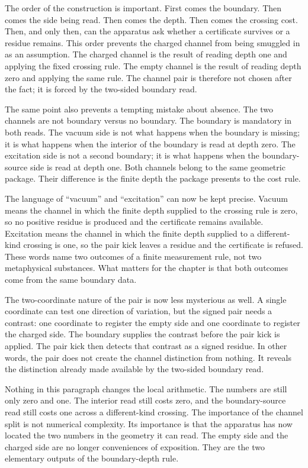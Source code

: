 The order of the construction is important. First comes the boundary. Then comes the
side being read. Then comes the depth. Then comes the crossing cost. Then, and only
then, can the apparatus ask whether a certificate survives or a residue remains. This
order prevents the charged channel from being smuggled in as an assumption. The
charged channel is the result of reading depth one and applying the fixed crossing
rule. The empty channel is the result of reading depth zero and applying the same
rule. The channel pair is therefore not chosen after the fact; it is forced by the
two-sided boundary read.

The same point also prevents a tempting mistake about absence. The two channels are
not boundary versus no boundary. The boundary is mandatory in both reads. The vacuum
side is not what happens when the boundary is missing; it is what happens when the
interior of the boundary is read at depth zero. The excitation side is not a second
boundary; it is what happens when the boundary-source side is read at depth one. Both
channels belong to the same geometric package. Their difference is the finite depth
the package presents to the cost rule.

The language of ``vacuum'' and ``excitation'' can now be kept precise. Vacuum means
the channel in which the finite depth supplied to the crossing rule is zero, so no
positive residue is produced and the certificate remains available. Excitation means
the channel in which the finite depth supplied to a different-kind crossing is one,
so the pair kick leaves a residue and the certificate is refused. These words name
two outcomes of a finite measurement rule, not two metaphysical substances. What
matters for the chapter is that both outcomes come from the same boundary data.

The two-coordinate nature of the pair is now less mysterious as well. A single
coordinate can test one direction of variation, but the signed pair needs a contrast:
one coordinate to register the empty side and one coordinate to register the charged
side. The boundary supplies the contrast before the pair kick is applied. The pair
kick then detects that contrast as a signed residue. In other words, the pair does
not create the channel distinction from nothing. It reveals the distinction already
made available by the two-sided boundary read.

Nothing in this paragraph changes the local arithmetic. The numbers are still only
zero and one. The interior read still costs zero, and the boundary-source read still
costs one across a different-kind crossing. The importance of the channel split is
not numerical complexity. Its importance is that the apparatus has now located the
two numbers in the geometry it can read. The empty side and the charged side are no
longer conveniences of exposition. They are the two elementary outputs of the
boundary-depth rule.

